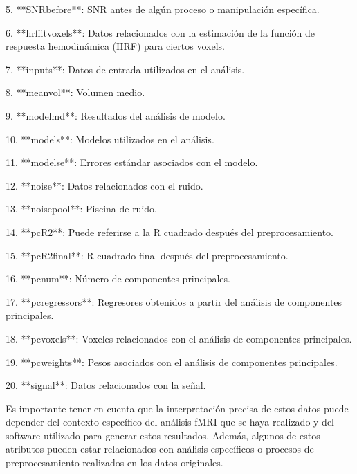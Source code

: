 \documentclass{article}
\begin{document}
	5. **SNRbefore**: SNR antes de algún proceso o manipulación específica.
	
	6. **hrffitvoxels**: Datos relacionados con la estimación de la función de respuesta hemodinámica (HRF) para ciertos voxels.
	
	7. **inputs**: Datos de entrada utilizados en el análisis.
	
	8. **meanvol**: Volumen medio.
	
	9. **modelmd**: Resultados del análisis de modelo.
	
	10. **models**: Modelos utilizados en el análisis.
	
	11. **modelse**: Errores estándar asociados con el modelo.
	
	12. **noise**: Datos relacionados con el ruido.
	
	13. **noisepool**: Piscina de ruido.
	
	14. **pcR2**: Puede referirse a la R cuadrado después del preprocesamiento.
	
	15. **pcR2final**: R cuadrado final después del preprocesamiento.
	
	16. **pcnum**: Número de componentes principales.
	
	17. **pcregressors**: Regresores obtenidos a partir del análisis de componentes principales.
	
	18. **pcvoxels**: Voxeles relacionados con el análisis de componentes principales.
	
	19. **pcweights**: Pesos asociados con el análisis de componentes principales.
	
	20. **signal**: Datos relacionados con la señal.
	
	Es importante tener en cuenta que la interpretación precisa de estos datos puede depender del contexto específico del análisis fMRI que se haya realizado y del software utilizado para generar estos resultados. Además, algunos de estos atributos pueden estar relacionados con análisis específicos o procesos de preprocesamiento realizados en los datos originales.
	
\end{document}
